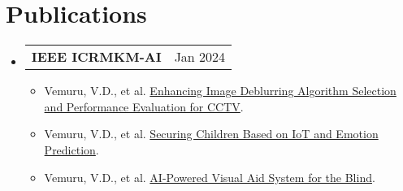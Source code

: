 \documentclass[letterpaper,10pt]{article}
\makeatletter
\newcommand{\resumeItem}[1]{
  \item\small{
    {#1 \vspace{-3pt}}
  }
}
\newcommand{\resumePublicationsHeading}[2]{
    \item
    \begin{tabular*}{0.97\textwidth}{l@{\extracolsep{\fill}}r}
      \small#1 & #2 \\
    \end{tabular*}\vspace{-6pt}
}
\newcommand{\resumeSubHeadingListStart}{\begin{itemize}[leftmargin=*]}
\newcommand{\resumeSubHeadingListEnd}{\end{itemize}}
\newcommand{\resumeItemListStart}{\begin{itemize}}
\newcommand{\resumeItemListEnd}{\end{itemize}\vspace{-6pt}}
\makeatother
\begin{document}
\section{Publications}
    \resumeSubHeadingListStart
      \resumePublicationsHeading
          {\textbf{IEEE ICRMKM-AI}}{Jan 2024}
          \resumeItemListStart
            \resumeItem{Vemuru, V.D., et al. \href{https://ieeexplore.ieee.org/document/10369555}{Enhancing Image Deblurring Algorithm Selection and Performance Evaluation for CCTV}.}
            \resumeItem{Vemuru, V.D., et al. \href{https://ieeexplore.ieee.org/document/10369553}{Securing Children Based on IoT and Emotion Prediction}.}
            \resumeItem{Vemuru, V.D., et al. \href{https://ieeexplore.ieee.org/document/10368901}{AI-Powered Visual Aid System for the Blind}.}
          \resumeItemListEnd
    \resumeSubHeadingListEnd
\end{document}
